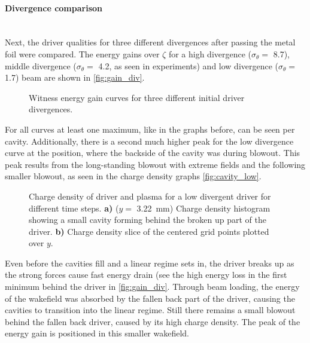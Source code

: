 \documentclass[bachelor_thesis]{subfiles}
\begin{document}
\paragraph*{Divergence comparison}\label{para:div_comp}\hspace{0pt} \\
Next, the driver qualities for three different divergences after passing the metal foil were compared. The energy gains over $\zeta$ for a high divergence ($\sigma_{\theta}=$ \qty{8.7}{\mrad}), middle divergence ($\sigma_{\theta}=$ \qty{4.2}{\mrad}, as seen in experiments) 
and low divergence ($\sigma_{\theta}=$ \qty{1.7}{\mrad}) beam are shown in \autoref{fig:gain_div}.
\begin{figure}
	\centering
	
	\caption{Witness energy gain curves for three different initial driver divergences.}
	\label{fig:gain_div}
\end{figure}
For all curves at least one maximum, like in the graphs before, can be seen per cavity. Additionally, there is a second much higher peak for the low divergence curve at the position, where the backside of the cavity was during blowout.
This peak results from the long-standing blowout with extreme fields and the following smaller blowout, as seen in the charge density graphs \autoref{fig:cavity_low}.

\begin{figure}
	\centering
	
	\caption{Charge density of driver and plasma for a low divergent driver for different time steps.
	\textbf{a)} ($y=$ \qty{3.22}{mm}) Charge density histogram showing a small cavity forming behind the broken up part of the driver.
	\textbf{b)} Charge density slice of the centered grid points plotted over $y$. 
	}
	\label{fig:cavity_low}
\end{figure}
Even before the cavities fill and a linear regime sets in, the driver breaks up as the strong forces cause fast energy drain (see the high energy loss in the first minimum behind the driver in \autoref{fig:gain_div}.
Through beam loading, the energy of the wakefield was absorbed by the fallen back part of the driver, causing the cavities to transition into the linear regime. 
Still there remains a small blowout behind the fallen back driver, caused by its high charge density. The peak of the energy gain is positioned in this smaller wakefield.
\end{document}
